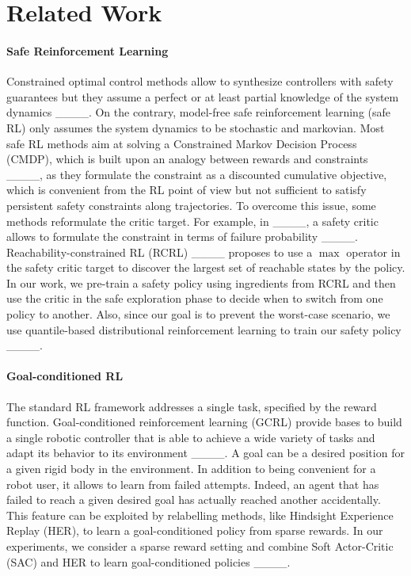\section{Related Work}
\label{section:related_work}

\paragraph{\textbf{Safe Reinforcement Learning}}
Constrained optimal control methods allow to synthesize controllers with safety guarantees but they assume a perfect or at least partial knowledge of the system dynamics ____. 
On the contrary, model-free safe reinforcement learning (safe RL) only assumes
the system dynamics to be stochastic and markovian. 
Most safe RL methods aim at solving a Constrained Markov Decision Process (CMDP),
which is built upon an analogy between rewards and constraints
____,
as they formulate the constraint as a discounted cumulative objective, which is convenient 
from the RL point of view but not sufficient to satisfy persistent safety constraints along trajectories.
To overcome this issue, some methods reformulate the critic target. For example, in ____, a safety critic allows to formulate the constraint in terms of failure probability ____. 
Reachability-constrained RL (RCRL) ____ proposes to use a $\max$ operator in the safety critic target to discover 
the largest set of reachable states by the policy.
In our work, we pre-train a safety policy using ingredients from RCRL and then use the critic in the
safe exploration phase to decide when to switch from one policy to another.
Also, since our goal is to prevent the worst-case scenario,
we use quantile-based distributional reinforcement learning to train our safety policy 
____.

\paragraph{\textbf{Goal-conditioned RL}}
The standard RL framework addresses a single task, specified by the reward function.
Goal-conditioned reinforcement learning (GCRL) provide 
bases to build a single robotic controller that is able to achieve a wide variety of tasks and
adapt its behavior to its environment ____.
A goal can be a desired position for a given rigid body in the environment. In addition to being convenient 
for a robot user, it allows to learn from failed attempts. Indeed, an agent that has failed to reach
a given desired goal has actually reached another accidentally.
This feature can be exploited by relabelling methods, like Hindsight Experience Replay
(HER), to learn a goal-conditioned policy from sparse rewards. 
In our experiments, we consider a sparse reward setting and combine  
Soft Actor-Critic (SAC) and HER to learn goal-conditioned policies ____. 

